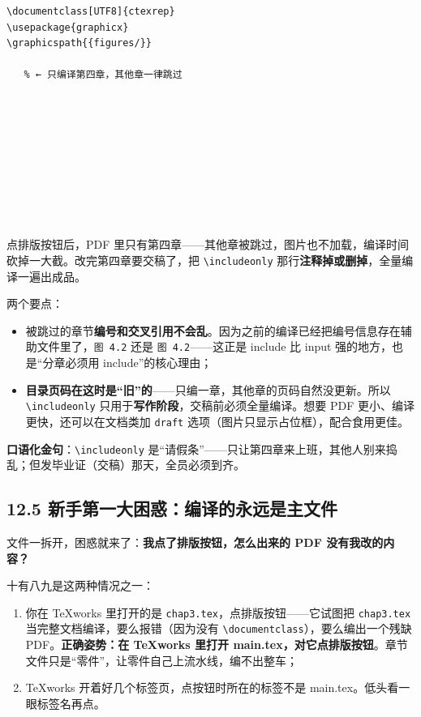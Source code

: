 \begin{lstlisting}
\documentclass[UTF8]{ctexrep}
\usepackage{graphicx}
\graphicspath{{figures/}}

   % ← 只编译第四章，其他章一律跳过










\end{lstlisting}

点排版按钮后，PDF 里只有第四章——其他章被跳过，图片也不加载，编译时间砍掉一大截。改完第四章要交稿了，把 \texttt{\textbackslash{}includeonly} 那行\textbf{注释掉或删掉}，全量编译一遍出成品。

两个要点：

\begin{itemize}
\setlength{\itemsep}{2pt}
\item 被跳过的章节\textbf{编号和交叉引用不会乱}。因为之前的编译已经把编号信息存在辅助文件里了，\texttt{图 4.2} 还是 \texttt{图 4.2}——这正是 include 比 input 强的地方，也是“分章必须用 include”的核心理由；
\item \textbf{目录页码在这时是“旧”的}——只编一章，其他章的页码自然没更新。所以 \texttt{\textbackslash{}includeonly} 只用于\textbf{写作阶段}，交稿前必须全量编译。想要 PDF 更小、编译更快，还可以在文档类加 \texttt{draft} 选项（图片只显示占位框），配合食用更佳。
\end{itemize}

\textbf{口语化金句}：\texttt{\textbackslash{}includeonly} 是“请假条”——只让第四章来上班，其他人别来捣乱；但发毕业证（交稿）那天，全员必须到齐。

\subsection*{12.5 新手第一大困惑：编译的永远是主文件}

文件一拆开，困惑就来了：\textbf{我点了排版按钮，怎么出来的 PDF 没有我改的内容？}

十有八九是这两种情况之一：

\begin{enumerate}
\setlength{\itemsep}{2pt}
\item 你在 TeXworks 里打开的是 \texttt{chap3.tex}，点排版按钮——它试图把 \texttt{chap3.tex} 当完整文档编译，要么报错（因为没有 \texttt{\textbackslash{}documentclass}），要么编出一个残缺 PDF。\textbf{正确姿势：在 TeXworks 里打开 main.tex，对它点排版按钮}。章节文件只是“零件”，让零件自己上流水线，编不出整车；
\item TeXworks 开着好几个标签页，点按钮时所在的标签不是 main.tex。低头看一眼标签名再点。
\end{enumerate}

